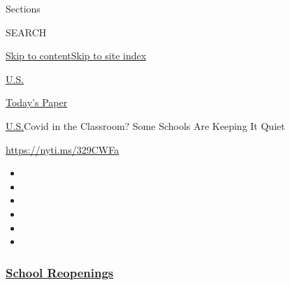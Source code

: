 Sections

SEARCH

\protect\hyperlink{site-content}{Skip to
content}\protect\hyperlink{site-index}{Skip to site index}

\href{https://www.nytimes3xbfgragh.onion/section/us}{U.S.}

\href{https://myaccount.nytimes3xbfgragh.onion/auth/login?response_type=cookie\&client_id=vi}{}

\href{https://www.nytimes3xbfgragh.onion/section/todayspaper}{Today's
Paper}

\href{/section/us}{U.S.}\textbar{}Covid in the Classroom? Some Schools
Are Keeping It Quiet

\url{https://nyti.ms/329CWFa}

\begin{itemize}
\item
\item
\item
\item
\item
\item
\end{itemize}

\hypertarget{school-reopenings}{%
\subsubsection{\texorpdfstring{\href{https://www.nytimes3xbfgragh.onion/spotlight/schools-reopening?name=styln-coronavirus-schools-reopening\&region=TOP_BANNER\&block=storyline_menu_recirc\&action=click\&pgtype=Article\&impression_id=78b271e0-f299-11ea-a3f6-692f6f3812c0\&variant=undefined}{School
Reopenings}}{School Reopenings}}\label{school-reopenings}}

